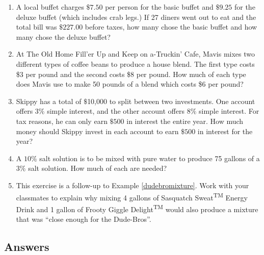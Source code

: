 \begin{enumerate}
\setcounter{enumi}{\value{HW}}

\item  A local buffet charges $\$7.50$ per person for the basic buffet and $\$9.25$ for the deluxe buffet (which includes crab legs.)  If 27 diners went out to eat and the total bill was $\$227.00$ before taxes, how many chose the basic buffet and how many chose the deluxe buffet?

\item At The Old Home Fill'er Up and Keep on a-Truckin' Cafe, Mavis mixes two different types of coffee beans to produce a house blend.   The first type costs \$3 per pound and the second costs \$8 per pound.  How much of each type does Mavis use to make 50 pounds of a blend which costs \$6 per pound?

\item  Skippy has a total of $\$$10,000 to split between two investments.  One account offers $3\%$ simple interest, and the other account offers $8\%$ simple interest.  For tax reasons, he can only earn $\$500$ in interest the entire year.  How much money should Skippy invest in each account to earn $\$500$ in interest for the year?

\item A $10 \%$ salt solution is to be mixed with pure water to produce 75 gallons of a $3\%$ salt solution.  How much of each are needed?

\item This exercise is a follow-up to Example \ref{dudebromixture}.  Work with your classmates to explain why mixing 4 gallons of Sasquatch Sweat\textsuperscript{TM} Energy Drink and 1 gallon of Frooty Giggle Delight\textsuperscript{TM} would also produce a mixture that was ``close enough for the Dude-Bros''.

\end{enumerate}

\newpage

\subsection{Answers}

